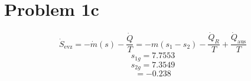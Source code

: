 \section*{Problem 1c}
\[
\dot{S}_{\text{evz}} = -\dot{m}(s) - \frac{\dot{Q}}{T} = -m(s_1 - s_2) - \frac{\dot{Q}_R}{T} + \frac{\dot{Q}_{\text{aus}}}{T}
\]
\[
s_{1g} = 7.7553
\]
\[
s_{2g} = 7.3549
\]
\[
= -0.238
\]